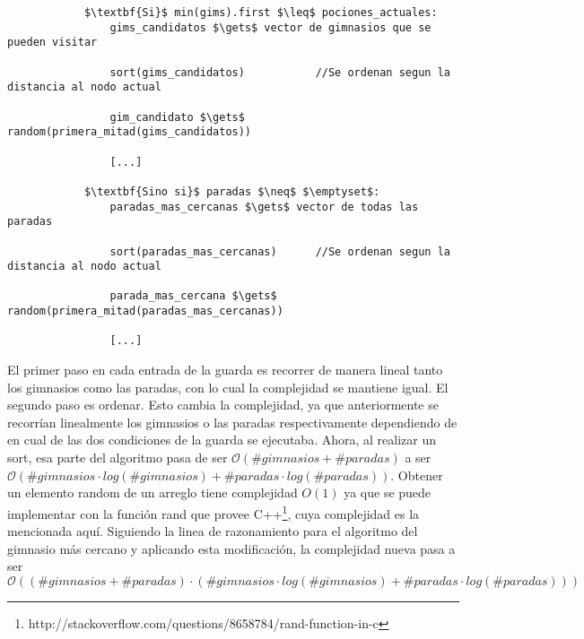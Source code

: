         \begin{lstlisting}
            $\textbf{Si}$ min(gims).first $\leq$ pociones_actuales:
                gims_candidatos $\gets$ vector de gimnasios que se pueden visitar

                sort(gims_candidatos)           //Se ordenan segun la distancia al nodo actual

                gim_candidato $\gets$ random(primera_mitad(gims_candidatos))

                [...]

            $\textbf{Sino si}$ paradas $\neq$ $\emptyset$:
                paradas_mas_cercanas $\gets$ vector de todas las paradas

                sort(paradas_mas_cercanas)      //Se ordenan segun la distancia al nodo actual

                parada_mas_cercana $\gets$ random(primera_mitad(paradas_mas_cercanas))

                [...]

        \end{lstlisting}

    El primer paso en cada entrada de la guarda es recorrer de manera lineal tanto los gimnasios como las paradas, con lo cual la complejidad se mantiene igual. El segundo paso es ordenar. Esto cambia la complejidad, ya que anteriormente se recorrían linealmente los gimnasios o las paradas respectivamente dependiendo de en cual de las dos condiciones de la guarda se ejecutaba. Ahora, al realizar un sort, esa parte del algoritmo pasa de ser $\mathcal{O}(\#gimnasios + \#paradas)$ a ser $\mathcal{O}(\#gimnasios \cdot log(\#gimnasios) + \#paradas \cdot log(\#paradas))$. Obtener un elemento random de un arreglo tiene complejidad $O(1)$ ya que se puede implementar con la función rand que provee C++\footnote{http://stackoverflow.com/questions/8658784/rand-function-in-c}, cuya complejidad es la mencionada aquí. Siguiendo la linea de razonamiento para el algoritmo del gimnasio más cercano y aplicando esta modificación, la complejidad nueva pasa a ser $\mathcal{O}((\#gimnasios + \#paradas) \cdot (\#gimnasios \cdot log(\#gimnasios) + \#paradas \cdot log(\#paradas)))$
